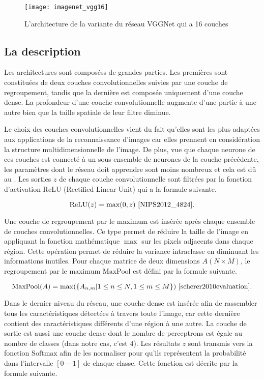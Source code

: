 \begin{figure}[h]
\begin{center}
\texttt{[image: imagenet\_vgg16]}
\caption[L'architecture de la variante du réseau VGGNet qui a 16 couches]
{L'architecture de la variante du réseau VGGNet qui a 16 couches~\cite{blier2016abrief}}
\end{center}
\end{figure}

\subsection{La description}

Les architectures sont composéss de grandes parties. Les premières sont
constituées de deux couches convolutionnelles suivies par une couche de regroupement,
tandis que la dernière est composée uniquement d'une couche dense. La
profondeur d'une couche convolutionnelle augmente d'une partie à une autre
bien que la taille spatiale de leur filtre diminue.

Le choix des couches convolutionnelles vient du fait qu'elles sont les plus
adaptées aux applications de la reconnaissance d'images car elles prennent en
considération la structure multidimensionnelle de l'image. De plus, vue que
chaque neurone de ces couches est connecté à un sous-ensemble de neurones de la
couche précédente, les paramètres dont le réseau doit apprendre sont moins nombreux et cela
est dû au . Les sorties $z$ de chaque couche
convolutionnelle sont filtrées par la fonction d'activation ReLU (Rectified Linear Unit)
qui a la formule suivante.

$$
\mathrm{ReLU}(z) = \max(0,z)~\cite{NIPS2012_4824}.
$$

Une couche de regroupement par le maximum est insérée après chaque ensemble de couches
convolutionnelles. Ce type permet de réduire la taille de l'image en appliquant
la fonction mathématique $\max$ sur les pixels adjacents dans chaque région. Cette
opération permet de réduire la variance intraclasse en diminuant les informations
inutiles. Pour chaque matrice de deux dimensions $A(N \times M)$, le regroupement
par le maximum $\mathrm{MaxPool}$ est défini par la formule suivante.

$$
\mathrm{MaxPool}(A) = \max(\{A_{n,m} | 1 \leq n \leq N, 1 \leq m \leq M\})~\cite{scherer2010evaluation}.
$$

Dans le dernier niveau du réseau, une couche dense est insérée afin de
rassembler tous les caractéristiques détectées à travers toute l'image, car cette
dernière contient des caractéristiques différents d'une région à une autre.
La couche de sortie est aussi une couche dense dont le nombre de perceptrons est
égale au nombre de classes (dans notre cas, c'est $4$). Les résultats $z$ sont
transmis vers la fonction $\mathrm{Softmax}$ afin de les normaliser pour
qu'ils représentent la probabilité dans l'intervalle $[0-1]$ de chaque classe.
Cette fonction est décrite par la formule suivante.

